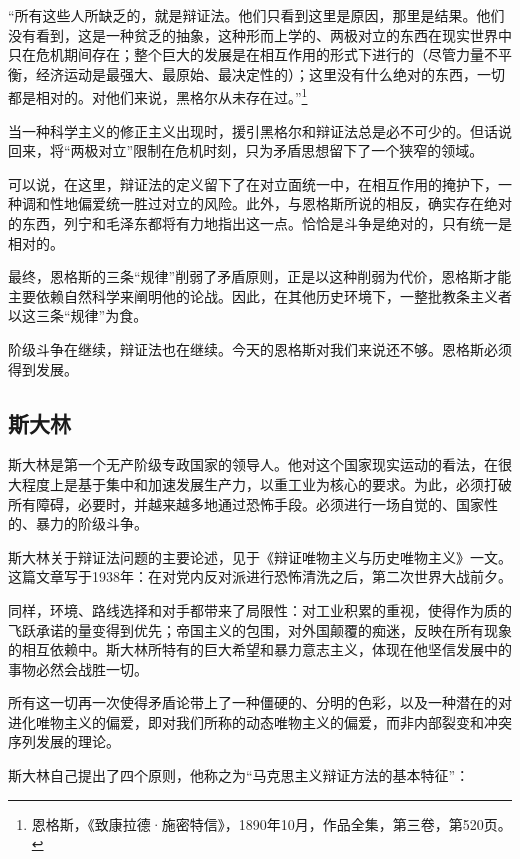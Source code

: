 \documentclass[fontset=fandol, a4paper, 12pt, twoside]{ctexart}
\renewenvironment{quote}
  {\list{}{\rightmargin=0cm \leftmargin=2em}%
   \item\relax\small\kaishu\color{black}}
  {\endlist}
\begin{document}
\begin{quote}
“所有这些人所缺乏的，就是辩证法。他们只看到这里是原因，那里是结果。他们没有看到，这是一种贫乏的抽象，这种形而上学的、两极对立的东西在现实世界中只在危机期间存在；整个巨大的发展是在相互作用的形式下进行的（尽管力量不平衡，经济运动是最强大、最原始、最决定性的）；这里没有什么绝对的东西，一切都是相对的。对他们来说，黑格尔从未存在过。”\footnote{恩格斯，《致康拉德·施密特信》，1890年10月，作品全集，第三卷，第520页。}
\end{quote}

当一种科学主义的修正主义出现时，援引黑格尔和辩证法总是必不可少的。但话说回来，将“两极对立”限制在危机时刻，只为矛盾思想留下了一个狭窄的领域。

可以说，在这里，辩证法的定义留下了在对立面统一中，在相互作用的掩护下，一种调和性地偏爱统一胜过对立的风险。此外，与恩格斯所说的相反，确实存在绝对的东西，列宁和毛泽东都将有力地指出这一点。恰恰是斗争是绝对的，只有统一是相对的。

最终，恩格斯的三条“规律”削弱了矛盾原则，正是以这种削弱为代价，恩格斯才能主要依赖自然科学来阐明他的论战。因此，在其他历史环境下，一整批教条主义者以这三条“规律”为食。

阶级斗争在继续，辩证法也在继续。今天的恩格斯对我们来说还不够。恩格斯必须得到发展。

\subsection{斯大林}

斯大林是第一个无产阶级专政国家的领导人。他对这个国家现实运动的看法，在很大程度上是基于集中和加速发展生产力，以重工业为核心的要求。为此，必须打破所有障碍，必要时，并越来越多地通过恐怖手段。必须进行一场自觉的、国家性的、暴力的阶级斗争。

斯大林关于辩证法问题的主要论述，见于《辩证唯物主义与历史唯物主义》一文。这篇文章写于1938年：在对党内反对派进行恐怖清洗之后，第二次世界大战前夕。

同样，环境、路线选择和对手都带来了局限性：对工业积累的重视，使得作为质的飞跃承诺的量变得到优先；帝国主义的包围，对外国颠覆的痴迷，反映在所有现象的相互依赖中。斯大林所特有的巨大希望和暴力意志主义，体现在他坚信发展中的事物必然会战胜一切。

所有这一切再一次使得矛盾论带上了一种僵硬的、分明的色彩，以及一种潜在的对进化唯物主义的偏爱，即对我们所称的动态唯物主义的偏爱，而非内部裂变和冲突序列发展的理论。

斯大林自己提出了四个原则，他称之为“马克思主义辩证方法的基本特征”：
\end{document}
